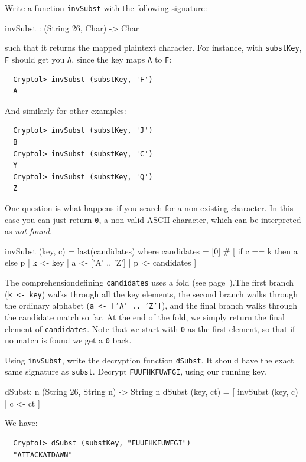 \begin{Exercise}\label{ex:subst:1}
Write a function {\tt invSubst} with the following signature:
\begin{code}
  invSubst : (String 26, Char) -> Char
\end{code}
such that it returns the mapped plaintext character. For instance,
with {\tt substKey}, {\tt F} should get you {\tt A}, since the key
maps {\tt A} to {\tt F}:
\begin{Verbatim}
  Cryptol> invSubst (substKey, 'F')
  A
\end{Verbatim}
And similarly for other examples:
\begin{Verbatim}
  Cryptol> invSubst (substKey, 'J')
  B
  Cryptol> invSubst (substKey, 'C')
  Y
  Cryptol> invSubst (substKey, 'Q')
  Z
\end{Verbatim}
One question is what happens if you search for a non-existing
character.  In this case you can just return {\tt 0}, a non-valid
ASCII character, which can be interpreted as {\em not found}.
\indFold
\end{Exercise}
\begin{Answer}
\begin{code}
  invSubst (key, c) = last(candidates)
    where candidates = [0] # [ if c == k then a else p
                             | k <- key
                             | a <- ['A' .. 'Z']
                             | p <- candidates
                             ]
\end{code}
The comprehension\indComp defining {\tt candidates} uses a fold (see
page~\pageref{par:fold}).\indFold The first branch ({\tt k <- key})
walks through all the key elements, the second branch walks through
the ordinary alphabet ({\tt a <- ['A' .. 'Z']}), and the final branch
walks through the candidate match so far. At the end of the fold, we
simply return the final element of {\tt candidates}. Note that we
start with {\tt 0} as the first element, so that if no match is found
we get a {\tt 0} back.
\end{Answer}

\begin{Exercise}\label{ex:subst:2}
  Using {\tt invSubst}, write the decryption function {\tt dSubst}.
  It should have the exact same signature as {\tt subst}.  Decrypt
  {\tt FUUFHKFUWFGI}, using our running key.
\end{Exercise}
\begin{Answer}
\begin{code}
  dSubst: {n} (String 26, String n) -> String n
  dSubst (key, ct) = [ invSubst (key, c) | c <- ct ]
\end{code}
We have:
\begin{Verbatim}
  Cryptol> dSubst (substKey, "FUUFHKFUWFGI")
  "ATTACKATDAWN"
\end{Verbatim}
\end{Answer}

